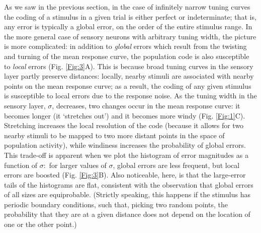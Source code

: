 \documentclass[a4paper]{article}%
\begin{document}
As we saw in the previous section, in the case of infinitely narrow tuning
curves the coding of a stimulus in a given trial is either perfect or
indeterminate; that is, any error is typically a global error, on the order of
the entire stimulus range. In the more general case of sensory neurons with
arbitrary tuning width, the picture is more complicated: in addition to
\textit{global} errors which result from the twisting and turning of the mean
response curve, the population code is also susceptible to \textit{local}
errors (Fig. \ref{Fig:3}A). This is because broad tuning curves in the sensory
layer partly preserve distances: locally, nearby stimuli are associated with
nearby points on the mean response curve; as a result, the coding of any given
stimulus is susceptible to local errors due to the response noise. As the
tuning width in the sensory layer, $\sigma$, decreases, two changes occur in
the mean response curve: it becomes longer (it `stretches out') and it
becomes more windy (Fig. \ref{Fig:1}C). Stretching increases the local
resolution of the code (because it allows for two nearby stimuli to be mapped
to two more distant points in the space of population activity), while
windiness increases the probability of global errors. This trade-off is
apparent when we plot the histogram of error magnitudes as a function of
$\sigma$:\ for larger values of $\sigma$, global errors are less frequent, but
local errors are boosted (Fig. \ref{Fig:3}B). Also noticeable, here, is that
the large-error tails of the histograms are flat, consistent with the
observation that global errors of all sizes are equiprobable. (Strictly
speaking, this happens if the stimulus has periodic boundary conditions, such
that, picking two random points, the probability that they are at a given
distance does not depend on the location of one or the other point.)
\end{document}
